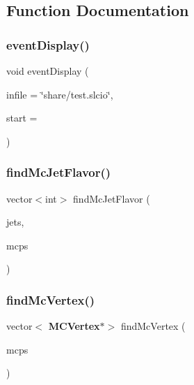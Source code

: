 \subsection{Function Documentation}
\mbox{\label{Driver_8h_aae42d96308cc8fcf6e9a0d7ac3d91056}} 
\subsubsection{event\+Display()}
{\footnotesize\ttfamily void event\+Display (\begin{DoxyParamCaption}\item[{const char $\ast$}]{infile = {\ttfamily \char`\"{}share/test.slcio\char`\"{}},  }\item[{int}]{start = {} }\end{DoxyParamCaption})}

\mbox{\label{Driver_8h_a2f8c524292151e0d683ceb75b7ffc581}} 
\subsubsection{find\+Mc\+Jet\+Flavor()}
{\footnotesize\ttfamily vector$<$int$>$ find\+Mc\+Jet\+Flavor (\begin{DoxyParamCaption}\item[{vector$<$ \textbf{ Jet} $\ast$$>$}]{jets,  }\item[{vector$<$ const \textbf{ M\+C\+Particle} $\ast$$>$}]{mcps }\end{DoxyParamCaption})}

\mbox{\label{Driver_8h_a87ccccca3d1bb92748df9882948de3c7}} 
\subsubsection{find\+Mc\+Vertex()}
{\footnotesize\ttfamily vector$<$\textbf{ M\+C\+Vertex}$\ast$$>$ find\+Mc\+Vertex (\begin{DoxyParamCaption}\item[{vector$<$ const \textbf{ M\+C\+Particle} $\ast$$>$}]{mcps }\end{DoxyParamCaption})}



